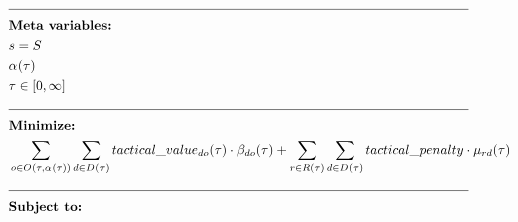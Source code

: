 \newpage
\begin{alignat}{2}
	& \text{\rule{\linewidth}{0.4pt}} \notag\\
	& \textbf{Meta variables:}                                                                                                                                                                                                                                                             \notag\\
	& \ElementScheduler = \SetScheduler                                                                                                                                                                                                                                                    \\
	& \VarStrategicWorkOrderAssignment{}{}                                                                                                                                                                                                                                                 \\
	& \tau \in [0, \infty]                                                                                                                                                                                                                                                                 \\
	& \text{\rule{\linewidth}{0.4pt}} \notag\\
	& \textbf{Minimize:}                                                                                                                                                                                                                                                                   \notag\\
	& \sum_{\ElementOperation \in \SetOperation{}{\VarStrategicWorkOrderAssignment{}{}}} \sum_{\ElementDays \in \SetDays{}} \ParTacticalValue \cdot \VarTacticalWork{\ElementDays}{\ElementOperation} + \sum_{r \in \SetResource} \sum_{\ElementDays \in \SetDays{}} \ParTacticalPenalty \cdot \VarTacticalExcess                                                                                                                                                                                \\  
	& \text{\rule{\linewidth}{0.4pt}} \notag\\
	& \textbf{Subject to:}                                                                                                                                                                                                                                                                 \notag\\

\end{alignat}
